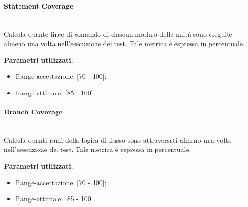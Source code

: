 			\paragraph{Statement Coverage}\mbox{} \\
			Calcola quante linee di comando di ciascun modulo delle unità sono eseguite almeno una volta nell'esecuzione dei test. Tale metrica è espressa in percentuale.

			\textbf{Parametri utilizzati}:
			\begin{itemize}
				\item Range-accettazione: [70 - 100];
				\item Range-ottimale: [85 - 100].
			\end{itemize}


			\paragraph{Branch Coverage}\mbox{} \\
			Calcola quanti rami della logica di flusso sono attraversati almeno una volta nell'esecuzione dei test. Tale metrica è espressa in percentuale.

			\textbf{Parametri utilizzati}:
			\begin{itemize}
				\item Range-accettazione: [70 - 100];
				\item Range-ottimale: [85 - 100].
			\end{itemize}
			
			

